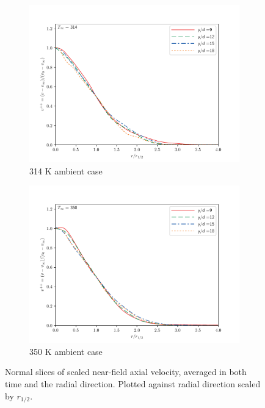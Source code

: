 \begin{figure}[H]
\begin{center}
\begin{subfigure}{0.45\textwidth}
	\includegraphics[scale=.45]{figures/Plots/radial/slices_3/314_ambient/r_vs_v.pdf}
	\caption{314 K ambient case} \label{noniso_near_r_vs_v_1}
\end{subfigure}
\begin{subfigure}{0.45\textwidth}
	\includegraphics[scale=.45]{figures/Plots/radial/slices_3/350_ambient/r_vs_v.pdf}
	\caption{350 K ambient case} \label{noniso_near_r_vs_v_2}
\end{subfigure}
\caption{Normal slices of scaled near-field axial velocity, averaged in both time and the radial direction. Plotted against radial direction scaled by $r_{1/2}$.}
\label{noniso_near_r_v_features}
\end{center}
\end{figure}

